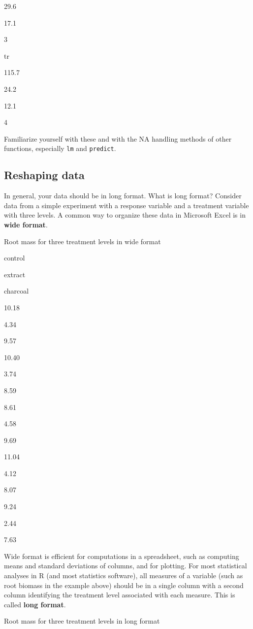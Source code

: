 \documentclass[]{book}
\begin{document}
29.6

17.1

3

tr

115.7

24.2

12.1

4

Familiarize yourself with these and with the NA handling methods of
other functions, especially \texttt{lm} and \texttt{predict}.

\subsection{Reshaping data}\label{reshaping-data}

In general, your data should be in long format. What is long format?
Consider data from a simple experiment with a response variable and a
treatment variable with three levels. A common way to organize these
data in Microsoft Excel is in \textbf{wide format}.

\label{tab:unnamed-chunk-12}Root mass for three treatment levels in wide
format

control

extract

charcoal

10.18

4.34

9.57

10.40

3.74

8.59

8.61

4.58

9.69

11.04

4.12

8.07

9.24

2.44

7.63

Wide format is efficient for computations in a spreadsheet, such as
computing means and standard deviations of columns, and for plotting.
For most statistical analyses in R (and most statistics software), all
measures of a variable (such as root biomass in the example above)
should be in a single column with a second column identifying the
treatment level associated with each measure. This is called
\textbf{long format}.

\label{tab:unnamed-chunk-13}Root mass for three treatment levels in long
format
\end{document}

